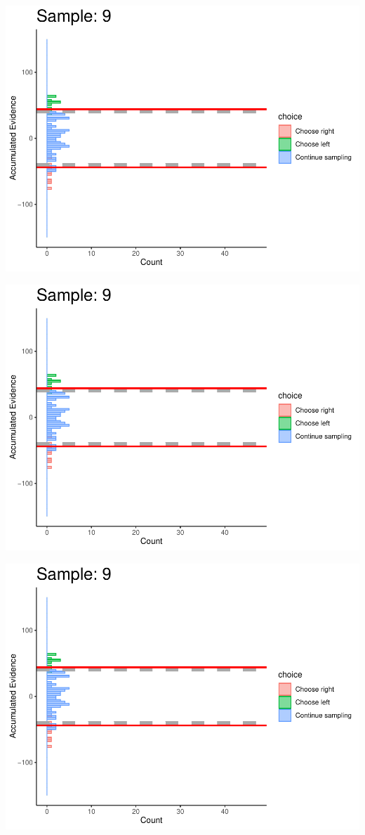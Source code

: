 \documentclass[
]{book}
\begin{document}
\begin{center}\includegraphics[width=0.8\linewidth]{LateNightBayes_files/figure-latex/collapsing_dcb-80} \end{center}

\begin{center}\includegraphics[width=0.8\linewidth]{LateNightBayes_files/figure-latex/collapsing_dcb-81} \end{center}

\begin{center}\includegraphics[width=0.8\linewidth]{LateNightBayes_files/figure-latex/collapsing_dcb-82} \end{center}
\end{document}
